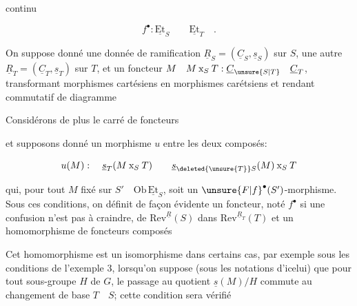 continu

\[
f^\bullet:\underline{\mathrm{Et}}_S\qquad\underline{\mathrm{Et}}_T\quad .
\]

On suppose donné une donnée de ramification $\underline{R}_S=(\underline{C}_S,\underline{s}_S)$ sur $S$, une autre $\underline{R}_T=(\underline{C}_T,\underline{s}_T)$ sur $T$, et un foncteur  $M\quad M\mathbin{\mathrm{x}}_S T:\underline{C}_{\unsure{S|T}}\quad\underline{C}_T$, transformant morphismes cartésiens en morphismes carétsiens et rendant commutatif de diagramme


Considérons de plus le carré de foncteurs


et supposons donné un morphisme $u$ entre les deux composés:

\[
u(M):\quad\underline{s}_T(M\mathbin{\mathrm{x}}_S T)\qquad
\underline{s}_{\deleted{\unsure{T}}S}(M)\mathbin{\mathrm{x}}_S T
\]

qui, pour tout $M$ fixé sur $S'\quad\mathrm{Ob}\,\underline{\mathrm{Et}}_S$, soit un ${\unsure{F|f}}^{\bullet}(S')$-morphisme. Sous ces conditions, on définit de façon évidente un foncteur, noté $f^\bullet$  si une confusion n'est pas à craindre, de $\mathrm{Rev}^{\underline R}(S)$ dans $\mathrm{Rev}^{\underline R_T}(T)$ et un homomorphisme de foncteurs composés


Cet homomorphisme est un isomorphisme dans certains cas, par exemple sous les conditions de l'exemple 3, lorsqu'on suppose (sous les notations d'icelui) que pour tout sous-groupe $H$ de $G$, le passage au quotient $\underline{s}(M)/H$ commute au changement de base $T\quad S$; cette condition sera vérifié
